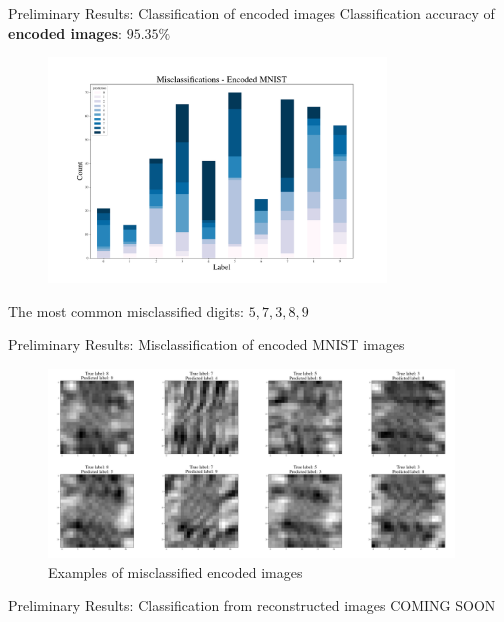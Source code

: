 \documentclass[10pt, t]{beamer}
\begin{document}
\begin{frame}{Preliminary Results: Classification of encoded images}
	Classification accuracy of \textbf{encoded images}: $95.35\%$\\
	\pause 
	\begin{figure}
		\includegraphics[width = 0.8\textwidth]{images/misclassifications_counts_encoded_mnist.png}
	\end{figure}
	The most common misclassified digits: $5,7,3,8,9$
\end{frame}

\begin{frame}{Preliminary Results: Misclassification of encoded MNIST images}
		\begin{figure}
			\includegraphics[width = 0.96\textwidth]{images/misclass_encoded_mnist_examples.png}
			\caption{Examples of misclassified encoded images}
		\end{figure}
\end{frame}

\begin{frame}{Preliminary Results: Classification from reconstructed images}
	\centering
	\vspace{0.2\framewidth}
	\Large{COMING SOON}
\end{frame}
\end{document}
